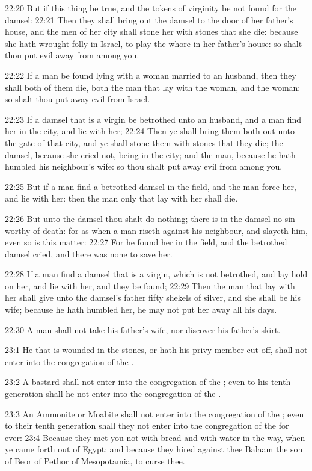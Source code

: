 22:20 But if this thing be true, and the tokens of virginity be not found for the damsel: 22:21 Then they shall bring out the damsel to the door of her father's house, and the men of her city shall stone her with stones that she die: because she hath wrought folly in Israel, to play the whore in her father's house: so shalt thou put evil away from among you.

22:22 If a man be found lying with a woman married to an husband, then they shall both of them die, both the man that lay with the woman, and the woman: so shalt thou put away evil from Israel.

22:23 If a damsel that is a virgin be betrothed unto an husband, and a man find her in the city, and lie with her; 22:24 Then ye shall bring them both out unto the gate of that city, and ye shall stone them with stones that they die; the damsel, because she cried not, being in the city; and the man, because he hath humbled his neighbour's wife: so thou shalt put away evil from among you.

22:25 But if a man find a betrothed damsel in the field, and the man force her, and lie with her: then the man only that lay with her shall die.

22:26 But unto the damsel thou shalt do nothing; there is in the damsel no sin worthy of death: for as when a man riseth against his neighbour, and slayeth him, even so is this matter: 22:27 For he found her in the field, and the betrothed damsel cried, and there was none to save her.

22:28 If a man find a damsel that is a virgin, which is not betrothed, and lay hold on her, and lie with her, and they be found; 22:29 Then the man that lay with her shall give unto the damsel's father fifty shekels of silver, and she shall be his wife; because he hath humbled her, he may not put her away all his days.

22:30 A man shall not take his father's wife, nor discover his father's skirt.

23:1 He that is wounded in the stones, or hath his privy member cut off, shall not enter into the congregation of the \LORD.

23:2 A bastard shall not enter into the congregation of the \LORD; even to his tenth generation shall he not enter into the congregation of the \LORD.

23:3 An Ammonite or Moabite shall not enter into the congregation of the \LORD; even to their tenth generation shall they not enter into the congregation of the \LORD for ever: 23:4 Because they met you not with bread and with water in the way, when ye came forth out of Egypt; and because they hired against thee Balaam the son of Beor of Pethor of Mesopotamia, to curse thee.

